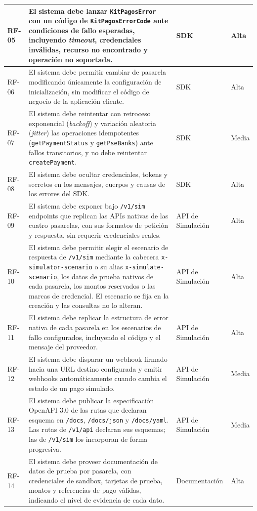 \begin{longtable}{|l|>{\raggedright\arraybackslash}p{}|>{\raggedright\arraybackslash}p{}|l|}
RF-05 & El sistema debe lanzar \texttt{KitPagosError} con un código de \texttt{KitPagosErrorCode} ante condiciones de fallo esperadas, incluyendo \textit{timeout}, credenciales inválidas, recurso no encontrado y operación no soportada. & SDK & Alta \\ \hline
RF-06 & El sistema debe permitir cambiar de pasarela modificando únicamente la configuración de inicialización, sin modificar el código de negocio de la aplicación cliente. & SDK & Alta \\ \hline
RF-07 & El sistema debe reintentar con retroceso exponencial (\textit{backoff}) y variación aleatoria (\textit{jitter}) las operaciones idempotentes (\texttt{getPaymentStatus} y \texttt{getPseBanks}) ante fallos transitorios, y no debe reintentar \texttt{createPayment}. & SDK & Media \\ \hline
RF-08 & El sistema debe ocultar credenciales, tokens y secretos en los mensajes, cuerpos y causas de los errores del SDK. & SDK & Alta \\ \hline
RF-09 & El sistema debe exponer bajo \texttt{/v1/sim} endpoints que replican las APIs nativas de las cuatro pasarelas, con sus formatos de petición y respuesta, sin requerir credenciales reales. & API de Simulación & Alta \\ \hline
RF-10 & El sistema debe permitir elegir el escenario de respuesta de \texttt{/v1/sim} mediante la cabecera \texttt{x-simulator-scenario} o su alias \texttt{x-simulate-scenario}, los datos de prueba nativos de cada pasarela, los montos reservados o las marcas de credencial. El escenario se fija en la creación y las consultas no lo alteran. & API de Simulación & Alta \\ \hline
RF-11 & El sistema debe replicar la estructura de error nativa de cada pasarela en los escenarios de fallo configurados, incluyendo el código y el mensaje del proveedor. & API de Simulación & Alta \\ \hline
RF-12 & El sistema debe disparar un webhook firmado hacia una URL destino configurada y emitir webhooks automáticamente cuando cambia el estado de un pago simulado. & API de Simulación & Media \\ \hline
RF-13 & El sistema debe publicar la especificación OpenAPI 3.0 de las rutas que declaran esquema en \texttt{/docs}, \texttt{/docs/json} y \texttt{/docs/yaml}. Las rutas de \texttt{/v1/api} declaran sus esquemas; las de \texttt{/v1/sim} los incorporan de forma progresiva. & API de Simulación & Media \\ \hline
RF-14 & El sistema debe proveer documentación de datos de prueba por pasarela, con credenciales de sandbox, tarjetas de prueba, montos y referencias de pago válidas, indicando el nivel de evidencia de cada dato. & Documentación & Alta \\ \hline

\end{longtable}
